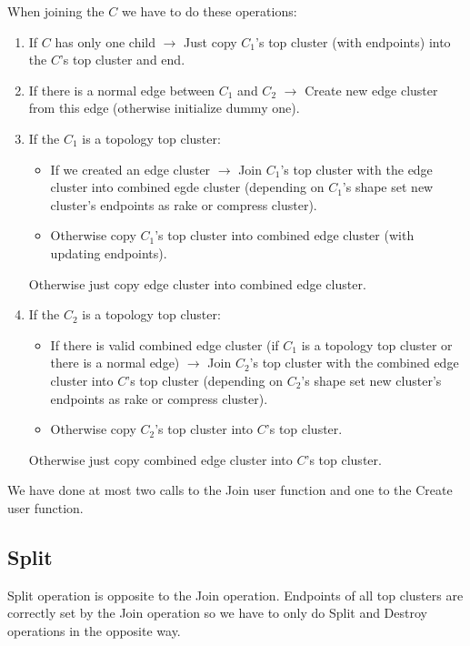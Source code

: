 When joining the $C$ we have to do these operations:
\begin{enumerate}

\item If $C$ has only one child $\rightarrow$ Just copy $C_1$'s {\I top cluster}
(with endpoints) into the $C$'s {\I top cluster} and end.

\item If there is a normal edge between $C_1$ and $C_2$ $\rightarrow$ Create new
{\I edge cluster} from this edge (otherwise initialize dummy one).

\item If the $C_1$ is a topology top cluster:
\begin{itemize}
\item If we created an {\I edge cluster} $\rightarrow$ Join $C_1$'s {\I top
cluster} with the {\I edge cluster} into {\I combined egde cluster} (depending
on $C_1$'s shape set new cluster's endpoints as rake or compress cluster).
\item Otherwise copy $C_1$'s {\I top cluster} into {\I combined edge cluster}
(with updating endpoints).
\end{itemize}
Otherwise just copy {\I edge cluster} into {\I combined edge cluster}.

\item If the $C_2$ is a topology top cluster:
\begin{itemize}
\item If there is valid {\I combined edge cluster} (if $C_1$ is a topology top
cluster or there is a normal edge) $\rightarrow$ Join $C_2$'s {\I top cluster}
with the {\I combined edge cluster} into $C$'s {\I top cluster} (depending
on $C_2$'s shape set new cluster's endpoints as rake or compress cluster).
\item Otherwise copy $C_2$'s {\I top cluster} into $C$'s {\I top cluster}.
\end{itemize}
Otherwise just copy {\I combined edge cluster} into $C$'s {\I top cluster}.

\end{enumerate}

We have done at most two calls to the Join user function and one to the Create
user function.

\subsection{Split}

Split operation is opposite to the Join operation. Endpoints of all top clusters
are correctly set by the Join operation so we have to only do Split and Destroy
operations in the opposite way.


